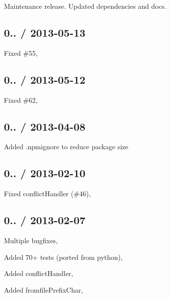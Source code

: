 \begin{DoxyItemize}
\item Maintenance release. Updated dependencies and docs.
\end{DoxyItemize}

\subsection*{0.. / 2013-\/05-\/13 }


\begin{DoxyItemize}
\item Fixed \#55, 
\end{DoxyItemize}

\subsection*{0.. / 2013-\/05-\/12 }


\begin{DoxyItemize}
\item Fixed \#62, 
\end{DoxyItemize}

\subsection*{0.. / 2013-\/04-\/08 }


\begin{DoxyItemize}
\item Added {\ttfamily .npmignore} to reduce package size
\end{DoxyItemize}

\subsection*{0.. / 2013-\/02-\/10 }


\begin{DoxyItemize}
\item Fixed conflict\+Handler (\#46), 
\end{DoxyItemize}

\subsection*{0.. / 2013-\/02-\/07 }


\begin{DoxyItemize}
\item Multiple bugfixes, 
\item Added 70+ tests (ported from python), 
\item Added conflict\+Handler, 
\item Added fromfile\+Prefix\+Char, 
\end{DoxyItemize}

